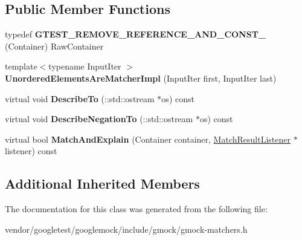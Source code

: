 \subsection*{Public Member Functions}
\begin{DoxyCompactItemize}
\item 
typedef {\bfseries G\+T\+E\+S\+T\+\_\+\+R\+E\+M\+O\+V\+E\+\_\+\+R\+E\+F\+E\+R\+E\+N\+C\+E\+\_\+\+A\+N\+D\+\_\+\+C\+O\+N\+S\+T\+\_\+} (Container) Raw\+Container\hypertarget{classtesting_1_1internal_1_1UnorderedElementsAreMatcherImpl_a6e8b7d421741a66ee7f2ebff7372897e}{}\label{classtesting_1_1internal_1_1UnorderedElementsAreMatcherImpl_a6e8b7d421741a66ee7f2ebff7372897e}

\item 
{\footnotesize template$<$typename Input\+Iter $>$ }\\{\bfseries Unordered\+Elements\+Are\+Matcher\+Impl} (Input\+Iter first, Input\+Iter last)\hypertarget{classtesting_1_1internal_1_1UnorderedElementsAreMatcherImpl_a0b0f40cf4de84f14020c3d4c9ba06c42}{}\label{classtesting_1_1internal_1_1UnorderedElementsAreMatcherImpl_a0b0f40cf4de84f14020c3d4c9ba06c42}

\item 
virtual void {\bfseries Describe\+To} (\+::std\+::ostream $\ast$os) const \hypertarget{classtesting_1_1internal_1_1UnorderedElementsAreMatcherImpl_a6dc7d9cefa0717b560cef48db83131bf}{}\label{classtesting_1_1internal_1_1UnorderedElementsAreMatcherImpl_a6dc7d9cefa0717b560cef48db83131bf}

\item 
virtual void {\bfseries Describe\+Negation\+To} (\+::std\+::ostream $\ast$os) const \hypertarget{classtesting_1_1internal_1_1UnorderedElementsAreMatcherImpl_af82233b636acbf0e195ede20cd6103f0}{}\label{classtesting_1_1internal_1_1UnorderedElementsAreMatcherImpl_af82233b636acbf0e195ede20cd6103f0}

\item 
virtual bool {\bfseries Match\+And\+Explain} (Container container, \hyperlink{classtesting_1_1MatchResultListener}{Match\+Result\+Listener} $\ast$listener) const \hypertarget{classtesting_1_1internal_1_1UnorderedElementsAreMatcherImpl_aac5710bbfb7e6ae7d69b72ba99b14938}{}\label{classtesting_1_1internal_1_1UnorderedElementsAreMatcherImpl_aac5710bbfb7e6ae7d69b72ba99b14938}

\end{DoxyCompactItemize}
\subsection*{Additional Inherited Members}


The documentation for this class was generated from the following file\+:\begin{DoxyCompactItemize}
\item 
vendor/googletest/googlemock/include/gmock/gmock-\/matchers.\+h\end{DoxyCompactItemize}
